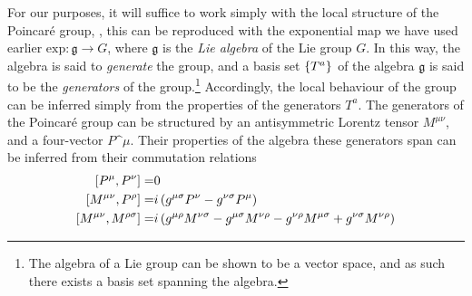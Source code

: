 \documentclass[../main.tex]{subfiles}
\begin{document}
For our purposes, it will suffice to work simply with the local structure of the Poincaré group, , this can be reproduced with the exponential map we have used earlier \(\text{exp} : \mathfrak{g} \to G\), where \(\mathfrak{g}\) is the \emph{Lie algebra} of the Lie group \(G\).
In this way, the algebra is said to \emph{generate} the group, and a basis set \(\left\{T^a\right\}\) of the algebra \(\mathfrak{g}\) is said to be the \emph{generators} of the group.\footnote{The algebra of a Lie group can be shown to be a vector space, and as such there exists a basis set spanning the algebra.}
Accordingly, the local behaviour of the group can be inferred simply from the properties of the generators \(T^a\).
The generators of the Poincaré group can be structured by an antisymmetric Lorentz tensor \(M^{\mu\nu}\), and a four-vector \(P\^\mu\).
Their properties of the algebra these generators span can be inferred from their commutation relations
\begin{subequations}
  \begin{align}
    \label{susy:eq:poincare_commutation1}
    \commutator{P\^\mu}{P\^\nu} =             & 0                                                                                                                                                \\
    \label{susy:eq:poincare_commutation3}
    \commutator{M^{\mu\nu}}{P^\rho} =         & i\pclosed{\metric{\mu}{\sigma} P^\nu - \metric{\nu}{\sigma} P^\mu}                                                                               \\
    \label{susy:eq:poincare_commutation3}
    \commutator{M^{\mu\nu}}{M^{\rho\sigma}} = & i\pclosed{\metric{\mu}{\rho}M^{\nu\sigma} - \metric{\mu}{\sigma}M^{\nu\rho} - \metric{\nu}{\rho}M^{\mu\sigma} + \metric{\nu}{\sigma}M^{\nu\rho}}
  \end{align}
\end{subequations}
\end{document}
